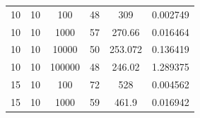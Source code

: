 \documentclass[11pt,a4paper]{report}
\begin{document}
\begin{table}[H]
{\begin{tabular}{c|c|c|c|c|c}
10                                                                                   & 10                                                                                     & 100                                                                       & 48                                                                                        & 309                                                                       & 0.002749              \\
10                                                                                   & 10                                                                                     & 1000                                                                      & 57                                                                                        & 270.66                                                                    & 0.016464              \\
10                                                                                   & 10                                                                                     & 10000                                                                     & 50                                                                                        & 253.072                                                                   & 0.136419              \\
10                                                                                   & 10                                                                                     & 100000                                                                    & 48                                                                                        & 246.02                                                                    & 1.289375              \\ \hline
15                                                                                   & 10                                                                                     & 100                                                                       & 72                                                                                        & 528                                                                       & 0.004562              \\
15                                                                                   & 10                                                                                     & 1000                                                                      & 59                                                                                        & 461.9                                                                     & 0.016942              \\

\end{tabular}}
\end{table}
\end{document}
